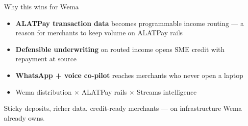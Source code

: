 \documentclass[aspectratio=169,11pt]{beamer}
\newcommand{\mutedtext}[1]{{\color{muted}#1}}
\begin{document}
\begin{frame}{Why this wins for Wema}
  \vspace{0.2cm}
  \begin{itemize}
    \item \textbf{ALATPay transaction data} becomes programmable income routing — a reason for merchants to keep volume on ALATPay rails
    \item \textbf{Defensible underwriting} on routed income opens SME credit with repayment at source
    \item \textbf{WhatsApp + voice co-pilot} reaches merchants who never open a laptop
    \item Wema distribution \;\(\times\)\; ALATPay rails \;\(\times\)\; Streams intelligence
  \end{itemize}
  \vspace{0.4cm}
  \mutedtext{Sticky deposits, richer data, credit-ready merchants — on infrastructure Wema already owns.}
\end{frame}
\end{document}
